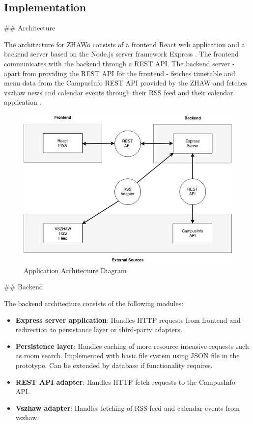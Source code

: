 \begin{markdown}
\section{Implementation} \label{implementation}

## Architecture

The architecture for ZHAWo consists of a frontend React \cite{React} web application and a backend server based on the Node.js \cite{Node} server framework Express \cite{Express}. The frontend communicates with the backend through a REST API. The backend server - apart from providing the REST API for the frontend - fetches timetable and menu data from the CampusInfo REST API provided by the ZHAW \cite{WikiCampusInfo} and fetches vszhaw news and calendar events through their RSS feed \cite{vszhawRSS} and their calendar application \cite{vszhawCalendar}.

\bigskip

\begin{figure}[H]
  \includegraphics[width=14cm, center]{../../diagrams/applicationArchitecture.png}
  \caption{\textsf{Application Architecture Diagram}}
\end{figure}

\bigskip

## Backend

The backend architecture consists of the following modules:

\begin{itemize}
  \item \textbf{Express server application}: Handles HTTP requests from frontend and redirection to persistance layer or third-party adapters.
  \item \textbf{Persistence layer}: Handles caching of more resource intensive requests such as room search. Implemented with basic file system using JSON file in the prototype. Can be extended by database if functionality requires.
  \item \textbf{REST API adapter}: Handles HTTP fetch requests to the CampusInfo API.
  \item \textbf{Vszhaw adapter}: Handles fetching of RSS feed and calendar events from vszhaw.
\end{itemize}


\end{markdown}
